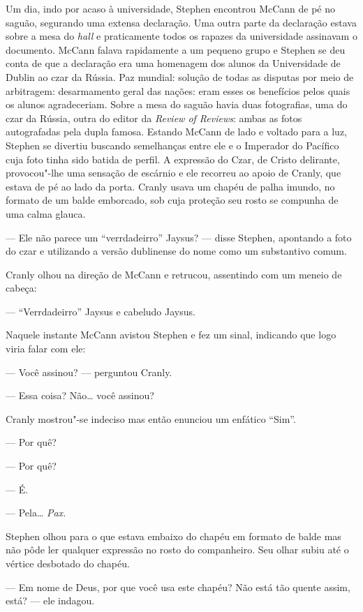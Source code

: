 Um dia, indo por acaso à universidade, Stephen encontrou McCann de pé no
saguão, segurando uma extensa declaração.  Uma outra parte da declaração estava
sobre a mesa do \textit{hall} e praticamente todos os rapazes da universidade
assinavam o documento.  McCann falava rapidamente a um pequeno grupo e Stephen
se deu conta de que a declaração era uma homenagem dos alunos da Universidade
de Dublin ao czar da Rússia.  Paz mundial: solução de todas as disputas por
meio de arbitragem: desarmamento geral das nações: eram esses os benefícios
pelos quais os alunos agradeceriam.  Sobre a mesa do saguão havia duas
fotografias, uma do czar da Rússia, outra do editor da \textit{Review of
Reviews}: ambas as fotos autografadas pela dupla famosa.  Estando McCann de
lado e voltado para a luz, Stephen se divertiu buscando semelhanças entre ele e
o Imperador do Pacífico cuja foto tinha sido batida de perfil.  A expressão do
Czar, de Cristo delirante, provocou"-lhe uma sensação de escárnio e ele recorreu
ao apoio de Cranly, que estava de pé ao lado da porta.  Cranly usava um chapéu
de palha imundo, no formato de um balde emborcado, sob cuja proteção seu rosto
se compunha de uma calma glauca.		

--- Ele não parece um “verrdadeirro” Jaysus? --- disse Stephen, apontando a
foto do czar e utilizando a versão dublinense do nome como um substantivo
comum.

Cranly olhou na direção de McCann e retrucou, assentindo com um meneio de
cabeça:

--- “Verrdadeirro” Jaysus e cabeludo Jaysus.

Naquele instante McCann avistou Stephen e fez um sinal, indicando que logo
viria falar com ele:

--- Você assinou? --- perguntou Cranly.

--- Essa coisa?  Não\ldots{} você assinou?

Cranly mostrou"-se indeciso mas então enunciou um enfático “Sim”.

--- Por quê?

--- Por quê?

--- É.

--- Pela\ldots{} \textit{Pax.}

Stephen olhou para o que estava embaixo do chapéu em formato de balde mas não
pôde ler qualquer expressão no rosto do companheiro.  Seu olhar subiu até o
vértice desbotado do chapéu.

--- Em nome de Deus, por que você usa este chapéu?  Não está tão quente assim,
está? --- ele indagou.

